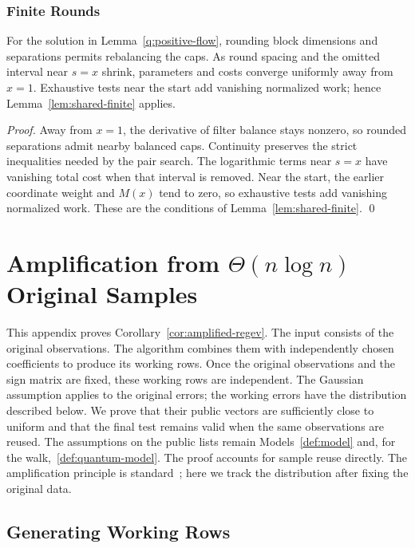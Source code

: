 \documentclass[runningheads,envcountsame,envcountsect,orivec]{llncs}
\begin{document}
\subsubsection{Finite Rounds}

\begin{lemma}
\label{lem:q-finite-rounds}
For the solution in Lemma~\ref{q:positive-flow}, rounding block
dimensions and separations permits rebalancing the caps.
As round spacing and the omitted interval near $s=x$ shrink, parameters
and costs converge uniformly away from $x=1$. Exhaustive
tests near the start add vanishing normalized work; hence
Lemma~\ref{lem:shared-finite} applies.
\end{lemma}

\begin{proof}
Away from $x=1$, the derivative of filter balance stays nonzero,
so rounded separations admit nearby balanced caps. Continuity
preserves the strict inequalities needed by the pair search.
The logarithmic terms near $s=x$ have vanishing total cost
when that interval is removed.
Near the start, the earlier coordinate weight and $M(x)$ tend
to zero, so exhaustive tests add vanishing normalized work.
These are the conditions of Lemma~\ref{lem:shared-finite}.
\qed
\end{proof}

\section{Amplification from \texorpdfstring{$\Theta(n\log n)$}{Theta(n log n)} Original Samples}
\label{app:amplification}

This appendix proves Corollary~\ref{cor:amplified-regev}.
The input consists of the original observations. The algorithm
combines them with independently chosen coefficients to produce
its working rows. Once the original observations and the sign
matrix are fixed, these working rows are independent. The
Gaussian assumption applies to the original errors; the working
errors have the distribution described below. We prove
that their public vectors are sufficiently close to uniform and
that the final test remains valid when the same observations
are reused. The assumptions on the public lists remain
Models~\ref{def:model} and, for the walk,~\ref{def:quantum-model}.
The proof accounts for sample reuse directly. The amplification
principle is standard~\cite[Section~7.3]{HKM18}; here we track
the distribution after fixing the original data.

\subsection{Generating Working Rows}
\end{document}
